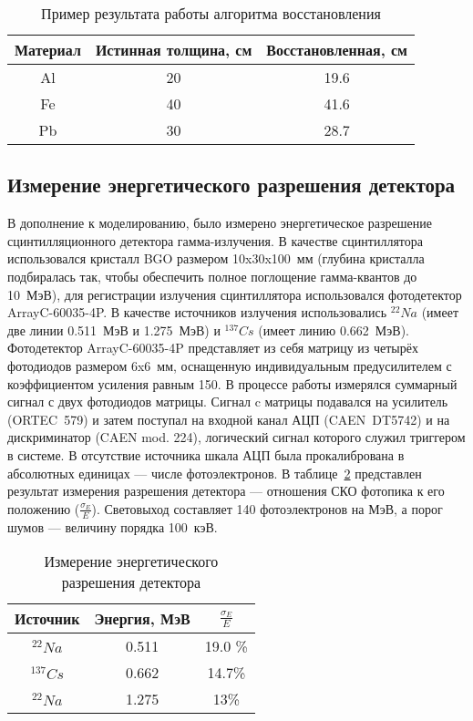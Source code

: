 \begin{table}
    \caption{Пример результата  работы алгоритма восстановления}
    \label{tab:rec}
    \begin{center}
        \begin{tabular}[c]{|c|c|c|}
            \hline 
            Материал & Истинная толщина, см & Восстановленная, см \\ 
            \hline 
            Al & 20 & 19.6 \\ 
            \hline 
            Fe & 40 & 41.6 \\ 
            \hline 
            Pb & 30 & 28.7 \\ 
            \hline 
        \end{tabular}
    \end{center}
\end{table}

\newpage
\subsection{Измерение энергетического разрешения детектора}
В дополнение к моделированию, было измерено энергетическое разрешение сцинтилляционного детектора гамма-излучения. В качестве сцинтиллятора использовался кристалл BGO размером 10x30x100~мм (глубина кристалла подбиралась так, чтобы обеспечить полное поглощение гамма-квантов до 10~МэВ), для регистрации излучения сцинтиллятора использовался фотодетектор ArrayC-60035-4P. В качестве источников излучения использовались $^{22}Na$ (имеет две линии 0.511~МэВ и 1.275~МэВ) и $^{137}Cs$ (имеет линию 0.662~МэВ). Фотодетектор ArrayC-60035-4P  представляет из себя матрицу из четырёх фотодиодов размером 6x6~мм, оснащенную индивидуальным предусилителем с коэффициентом усиления равным 150. В процессе работы измерялся суммарный сигнал с двух фотодиодов матрицы. Сигнал c матрицы подавался на усилитель (ORTEC~579) и затем поступал на входной канал АЦП (CAEN~DT5742) и на дискриминатор (CAEN mod. 224), логический сигнал которого служил триггером в системе. В отсутствие источника шкала АЦП была прокалибрована в абсолютных единицах --- числе фотоэлектронов. В таблице~\ref{tab:ex} представлен результат измерения разрешения детектора ---  отношения СКО фотопика к его положению ($\frac{\sigma_E}{E}$). Световыход составляет 140 фотоэлектронов на МэВ, а порог шумов --- величину порядка 100~кэВ.\\
\begin{table}
    \caption{Измерение энергетического разрешения детектора}
    \label{tab:ex}
    \begin{center} 
        \begin{tabular}[c]{|c|c|c|}
            \hline 
            Источник & Энергия, МэВ & $\frac{\sigma_E}{E}$\\
            \hline 
            $^{22}Na$&0.511 & 19.0 \%  \\ 
            \hline 
            $^{137}Cs$&0.662 & 14.7\%\\ 
            \hline 
            $^{22}Na$& 1.275 & 13\% \\
            \hline 
        \end{tabular} 
    \end{center}
\end{table}


